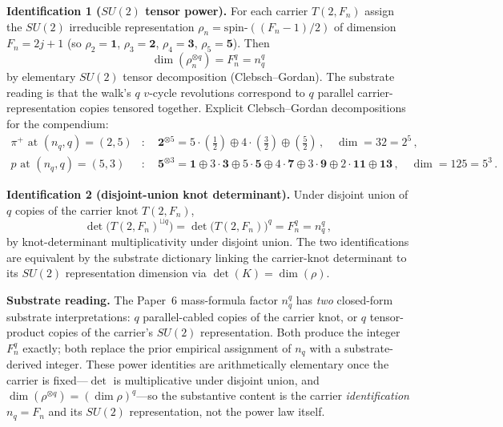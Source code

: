 \documentclass[11pt]{article}
\newcommand{\half}{\tfrac{1}{2}}
\begin{document}
\textbf{Identification 1 ($SU(2)$ tensor power).}  For each carrier $T(2, F_n)$ assign the $SU(2)$ irreducible representation $\rho_n = \mathrm{spin}\text{-}((F_n - 1)/2)$ of dimension $F_n = 2j + 1$ (so $\rho_2 = \mathbf{1}$, $\rho_3 = \mathbf{2}$, $\rho_4 = \mathbf{3}$, $\rho_5 = \mathbf{5}$).  Then
\begin{equation}
  \dim(\rho_n^{\otimes q}) = F_n^q = n_q^q
\end{equation}
by elementary $SU(2)$ tensor decomposition (Clebsch--Gordan).  The substrate reading is that the walk's $q$ $v$-cycle revolutions correspond to $q$ parallel carrier-representation copies tensored together.  Explicit Clebsch--Gordan decompositions for the compendium:
\begin{align}
  \pi^+ \text{ at } (n_q, q) = (2, 5) &: \quad \mathbf{2}^{\otimes 5}
    = 5 \cdot (\half) \oplus 4 \cdot (\tfrac{3}{2}) \oplus (\tfrac{5}{2}) \, , \quad \dim = 32 = 2^5 \, , \\
  p \text{ at } (n_q, q) = (5, 3) &: \quad \mathbf{5}^{\otimes 3}
    = \mathbf{1} \oplus 3 \cdot \mathbf{3} \oplus 5 \cdot \mathbf{5} \oplus 4 \cdot \mathbf{7} \oplus 3 \cdot \mathbf{9} \oplus 2 \cdot \mathbf{11} \oplus \mathbf{13} \, , \quad \dim = 125 = 5^3 \, .
\end{align}

\textbf{Identification 2 (disjoint-union knot determinant).}  Under disjoint union of $q$ copies of the carrier knot $T(2, F_n)$,
\begin{equation}
  \det\!\bigl( T(2, F_n)^{\sqcup q} \bigr) = \det\!\bigl( T(2, F_n) \bigr)^q = F_n^q = n_q^q \, ,
\end{equation}
by knot-determinant multiplicativity under disjoint union.  The two identifications are equivalent by the substrate dictionary linking the carrier-knot determinant to its $SU(2)$ representation dimension via $\det(K) = \dim(\rho)$.

\textbf{Substrate reading.}  The Paper~6 mass-formula factor $n_q^q$ has \emph{two} closed-form substrate interpretations: $q$ parallel-cabled copies of the carrier knot, or $q$ tensor-product copies of the carrier's $SU(2)$ representation.  Both produce the integer $F_n^q$ exactly; both replace the prior empirical assignment of $n_q$ with a substrate-derived integer.  These power identities are arithmetically elementary once the carrier is fixed---$\det$ is multiplicative under disjoint union, and $\dim(\rho^{\otimes q}) = (\dim\rho)^q$---so the substantive content is the carrier \emph{identification} $n_q = F_n$ and its $SU(2)$ representation, not the power law itself.
\end{document}
